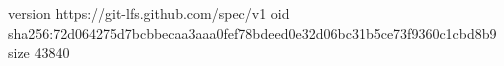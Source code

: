 version https://git-lfs.github.com/spec/v1
oid sha256:72d064275d7bcbbecaa3aaa0fef78bdeed0e32d06bc31b5ce73f9360c1cbd8b9
size 43840
